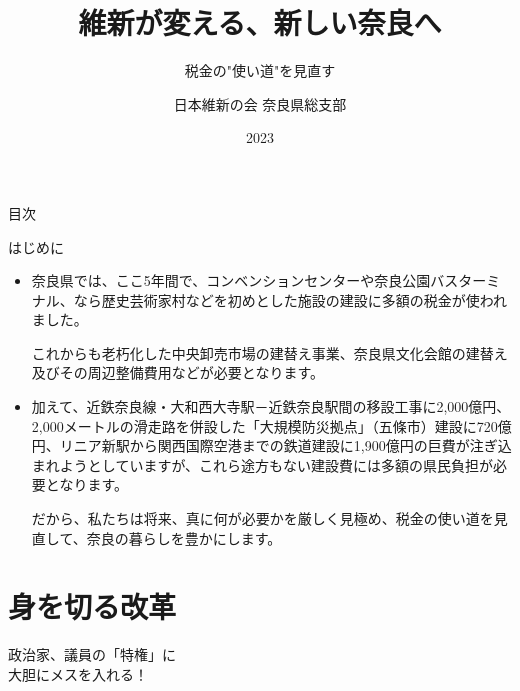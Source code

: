 \documentclass[dvipdfmx]{beamer}
\title{維新が変える、新しい奈良へ}
\subtitle{税金の"使い道"を見直す}
\author{日本維新の会 奈良県総支部}
\date{2023}
\begin{document}
\maketitle

\begin{frame}{目次}
    \tableofcontents
\end{frame}

\begin{frame}{はじめに}{}
    \begin{small}
        \begin{itemize}
            \setlength{\parsep}{.5mm}
            \setlength{\itemsep}{2mm}
            \item 奈良県では、ここ5年間で、コンベンションセンターや奈良公園バスターミナル、なら歴史芸術家村などを初めとした施設の建設に多額の税金が使われました。\par
            これからも老朽化した中央卸売市場の建替え事業、奈良県文化会館の建替え及びその周辺整備費用などが必要となります。
            \item 加えて、近鉄奈良線・大和西大寺駅－近鉄奈良駅間の移設工事に2,000億円、2,000メートルの滑走路を併設した「大規模防災拠点」（五條市）建設に720億円、リニア新駅から関西国際空港までの鉄道建設に1,900億円の巨費が注ぎ込まれようとしていますが、これら途方もない建設費には多額の県民負担が必要となります。\par
            だから、私たちは将来、真に何が必要かを厳しく見極め、税金の使い道を見直して、奈良の暮らしを豊かにします。
        \end{itemize}
    \end{small}
\end{frame}

\section{身を切る改革}
    \begin{frame}{}{}
        \sectionpage
        \begin{center}
            \begin{large}
                \alert{政治家、議員の「特権」に}\\\alert{大胆にメスを入れる！}
            \end{large}
        \end{center}
    \end{frame}
\end{document}
